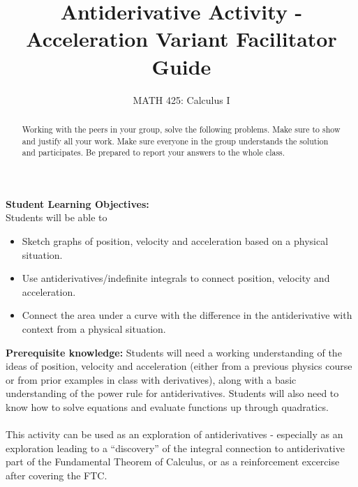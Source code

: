 \documentclass{ximera}
\title{Antiderivative Activity - Acceleration Variant Facilitator Guide  }
\author{MATH 425: Calculus I}
\begin{document}
\begin{abstract}
    Working with the peers in your group, solve the following problems. Make sure to show and justify all your work. Make sure everyone in the group understands the solution and participates. Be prepared to report your answers to the whole class. 
\end{abstract}
\maketitle

\textbf{Student Learning Objectives:}\\
Students will be able to 
\begin{itemize}
    \item Sketch graphs of position, velocity and acceleration based on a physical situation.
    \item Use antiderivatives/indefinite integrals to connect position, velocity and acceleration.
    \item Connect the area under a curve with the difference in the antiderivative with context from a physical situation.
\end{itemize}
\textbf{Prerequisite knowledge:} Students will need a working understanding of the ideas of position, velocity and acceleration (either from a previous physics course or from prior examples in class with derivatives), along with a basic understanding of the power rule for antiderivatives.  Students will also need to know how to solve equations and evaluate functions up through quadratics. \\
\\
This activity can be used as an exploration of antiderivatives - especially as an exploration leading to a ``discovery'' of the integral connection to antiderivative part of the Fundamental Theorem of Calculus, or as a reinforcement excercise after covering the FTC.
\end{document}
